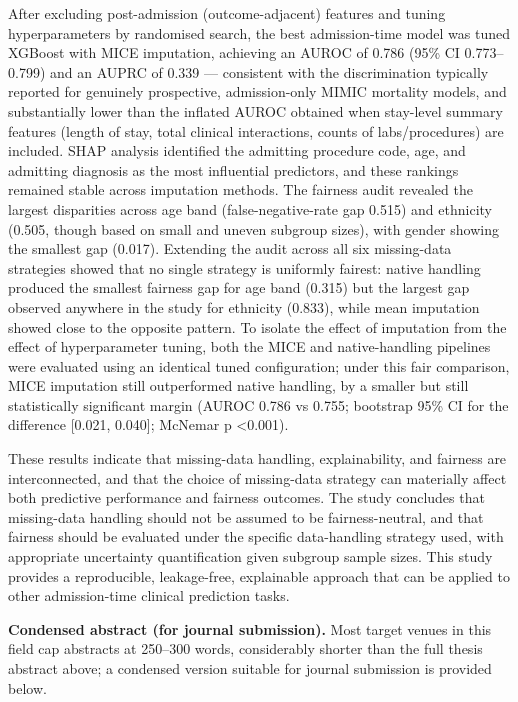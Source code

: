 \documentclass[12pt,a4paper]{report}
\begin{document}
After excluding post-admission (outcome-adjacent) features and tuning hyperparameters by randomised search, the best admission-time model was tuned XGBoost with MICE imputation, achieving an AUROC of 0.786 (95\% CI 0.773--0.799) and an AUPRC of 0.339 --- consistent with the discrimination typically reported for genuinely prospective, admission-only MIMIC mortality models, and substantially lower than the inflated AUROC obtained when stay-level summary features (length of stay, total clinical interactions, counts of labs/procedures) are included. SHAP analysis identified the admitting procedure code, age, and admitting diagnosis as the most influential predictors, and these rankings remained stable across imputation methods. The fairness audit revealed the largest disparities across age band (false-negative-rate gap 0.515) and ethnicity (0.505, though based on small and uneven subgroup sizes), with gender showing the smallest gap (0.017). Extending the audit across all six missing-data strategies showed that no single strategy is uniformly fairest: native handling produced the smallest fairness gap for age band (0.315) but the largest gap observed anywhere in the study for ethnicity (0.833), while mean imputation showed close to the opposite pattern. To isolate the effect of imputation from the effect of hyperparameter tuning, both the MICE and native-handling pipelines were evaluated using an identical tuned configuration; under this fair comparison, MICE imputation still outperformed native handling, by a smaller but still statistically significant margin (AUROC 0.786 vs 0.755; bootstrap 95\% CI for the difference [0.021, 0.040]; McNemar p \textless 0.001).

These results indicate that missing-data handling, explainability, and fairness are interconnected, and that the choice of missing-data strategy can materially affect both predictive performance and fairness outcomes. The study concludes that missing-data handling should not be assumed to be fairness-neutral, and that fairness should be evaluated under the specific data-handling strategy used, with appropriate uncertainty quantification given subgroup sample sizes. This study provides a reproducible, leakage-free, explainable approach that can be applied to other admission-time clinical prediction tasks.

\bigskip
\noindent\textbf{Condensed abstract (for journal submission).} Most target venues in this field cap abstracts at 250--300 words, considerably shorter than the full thesis abstract above; a condensed version suitable for journal submission is provided below.
\end{document}
